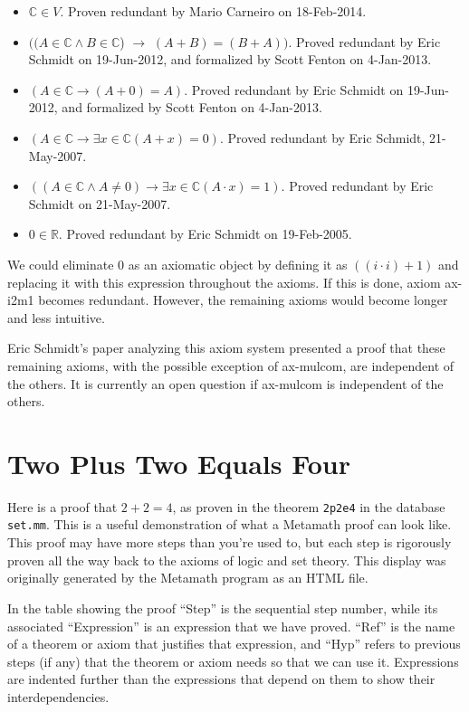 \begin{itemize}
\item
  $\mathbb{C} \in V$.
  Proven redundant by Mario Carneiro on 18-Feb-2014.
\item
  $((A \in \mathbb{C} \land B \in \mathbb{C}$) $\rightarrow$
  $(A + B) = (B + A))$.
  Proved redundant by Eric Schmidt on 19-Jun-2012,
  and formalized by Scott Fenton on 4-Jan-2013.
\item
  $(A \in \mathbb{C} \rightarrow (A + 0) = A)$.
  Proved redundant by Eric Schmidt on 19-Jun-2012,
  and formalized by Scott Fenton on 4-Jan-2013.
\item
  $(A \in \mathbb{C} \rightarrow \exists x \in \mathbb{C} (A + x) = 0)$.
Proved redundant by Eric Schmidt, 21-May-2007.
\item
  $((A \in \mathbb{C} \land A \ne 0) \rightarrow \exists x \in \mathbb{C} (A \cdot x) = 1)$.
  Proved redundant by Eric Schmidt on 21-May-2007.
\item
  $0 \in \mathbb{R}$.
  Proved redundant by Eric Schmidt on 19-Feb-2005.
\end{itemize}

We could eliminate 0 as an axiomatic object by defining it as
$( ( i \cdot i ) + 1 )$
and replacing it with this expression throughout the axioms. If this
is done, axiom ax-i2m1 becomes redundant. However, the remaining axioms
would become longer and less intuitive.

Eric Schmidt's paper analyzing this axiom system \cite{Schmidt}
presented a proof that these remaining axioms,
with the possible exception of ax-mulcom, are independent of the others.
It is currently an open question if ax-mulcom is independent of the others.

\section{Two Plus Two Equals Four}\label{2p2e4}

Here is a proof that $2 + 2 = 4$, as proven in the theorem \texttt{2p2e4}
in the database \texttt{set.mm}.
This is a useful demonstration of what a Metamath proof can look like.
This proof may have more steps than you're used to, but each step is rigorously
proven all the way back to the axioms of logic and set theory.
This display was originally generated by the Metamath program
as an HTML file.

In the table showing the proof ``Step'' is the sequential step number,
while its associated ``Expression'' is an expression that we have proved.
``Ref'' is the name of a theorem or axiom that justifies that expression,
and ``Hyp'' refers to previous steps (if any) that the theorem or axiom
needs so that we can use it.  Expressions are indented further than
the expressions that depend on them to show their interdependencies.

